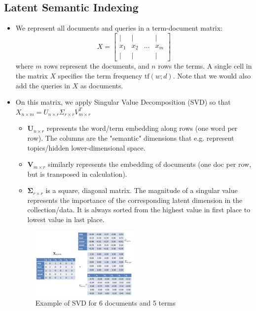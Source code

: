 \subsection{Latent Semantic Indexing}
\begin{itemize}
	\item We represent all documents and queries in a term-document matrix:
	$$X = \left[\begin{array}{cccc}
	| & | &  & | \\
	x_1 & x_2 & \dots & x_m \\
	| & | &  & | 
	\end{array}\right]$$
	where $m$ rows represent the documents, and $n$ rows the terms. A single cell in the matrix $X$ specifies the term frequency $\text{tf}(w;d)$. Note that we would also add the queries in $X$ as documents.
	\item On this matrix, we apply Singular Value Decomposition (SVD) so that $X_{n\times m} = U_{n \times r} \Sigma_{r\times r} V_{m\times r}^T$
	\begin{itemize}
		\item $\bm{U}_{n \times r}$ represents the word/term embedding along rows (one word per row). The columns are the "semantic" dimensions that e.g. represent topics/hidden lower-dimensional space. 
		\item $\bm{V}_{m \times r}$ similarly represents the embedding of documents (one doc per row, but is transposed in calculation). 
		\item $\bm{\Sigma}_{r \times r}$ is a square, diagonal matrix. The magnitude of a singular value represents the importance of the corresponding latent dimension in the collection/data. It is always sorted from the highest value in first place to lowest value in last place.
	\end{itemize}
	\begin{figure}[ht]
		\centering
		\includegraphics[width=0.5\textwidth]{figures/semantic_matching_SVD_example.png}
		\caption{Example of SVD for 6 documents and 5 terms}
		\label{img:semantic_matching_SVD_example}
	\end{figure}

\end{itemize}
